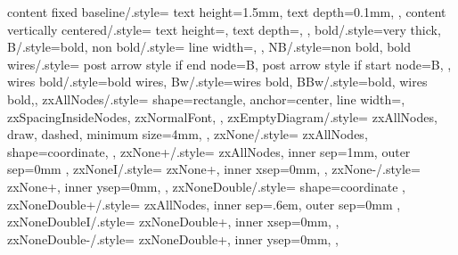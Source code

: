 {{    content fixed baseline/.style={
      text height=1.5mm,%
      text depth=0.1mm,%
    },
    content vertically centered/.style={
      text height=,
      text depth=,
    },
    bold/.style={very thick},
    B/.style={bold},
    non bold/.style={%
      line width=\zxDefaultLineWidth,
    },
    NB/.style={non bold},
    bold wires/.style={
      post arrow style if end node={B},
      post arrow style if start node={B},
    },
    wires bold/.style={bold wires},%
    Bw/.style={wires bold},
    BBw/.style={bold, wires bold,},
    zxAllNodes/.style={
      shape=rectangle, %
      anchor=center, %
      line width=\zxDefaultLineWidth,
      zxSpacingInsideNodes,
      zxNormalFont,
    },
    zxEmptyDiagram/.style={
      zxAllNodes,
      draw,
      dashed,
      minimum size=4mm,
    },
    zxNone/.style={
      zxAllNodes,
      shape=coordinate, %
    },
    zxNone+/.style={
      zxAllNodes,
      inner sep=1mm,
      outer sep=0mm
    },
    zxNoneI/.style={
      zxNone+,
      inner xsep=0mm,
    },
    zxNone-/.style={
      zxNone+,
      inner ysep=0mm,
    },
    zxNoneDouble/.style={
      shape=coordinate
    },
    zxNoneDouble+/.style={
      zxAllNodes,
      inner sep=.6em,
      outer sep=0mm
    },
    zxNoneDoubleI/.style={
      zxNoneDouble+,
      inner xsep=0mm,
    },
    zxNoneDouble-/.style={
      zxNoneDouble+,
      inner ysep=0mm,
    },
}}

